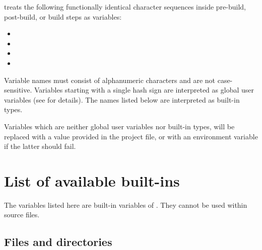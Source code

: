 \codeblocks treats the following functionally identical character sequences inside pre-build, post-build, or build steps as variables:

\begin{itemize}
\item {}
\item {}
\item {}
\item {}
\end{itemize}

Variable names must consist of alphanumeric characters and are not case-sensitive. Variables starting with a single hash sign \codeline{(#)} are interpreted as global user variables (see  for details). The names listed below are interpreted as built-in types.

Variables which are neither global user variables nor built-in types, will be replaced with a value provided in the project file, or with an environment variable if the latter should fail.


\section{List of available built-ins}\label{sec:builtin_variables}

The variables listed here are built-in variables of \codeblocks. They cannot be used within source files.

\subsection{Files and directories}

